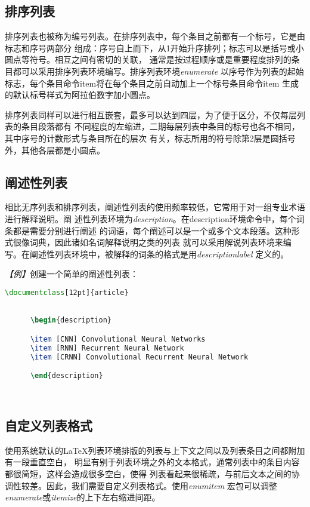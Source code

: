 {\subsection{排序列表}
排序列表也被称为编号列表。在排序列表中，每个条目之前都有一个标号，它是由标志和序号两部分
组成：序号自上而下，从1开始升序排列；标志可以是括号或小圆点等符号。相互之间有密切的关联，
通常是按过程顺序或是重要程度排列的条目都可以采用排序列表环境编写。排序列表环境\emph{enumerate}
以序号作为列表的起始标志，每个条目命令item将在每个条目之前自动加上一个标号条目命令item
生成的默认标号样式为阿拉伯数字加小圆点。

排序列表同样可以进行相互嵌套，最多可以达到四层，为了便于区分，不仅每层列表的条目段落都有
不同程度的左缩进，二期每层列表中条目的标号也各不相同，其中序号的计数形式与条目所在的层次
有关，标志所用的符号除第2层是圆括号外，其他各层都是小圆点。

\subsection{阐述性列表}
相比无序列表和排序列表，阐述性列表的使用频率较低，它常用于对一组专业术语进行解释说明。阐
述性列表环境为\emph{description}。在description环境命令中，每个词条都是需要分别进行阐述
的词语，每个阐述可以是一个或多个文本段落。这种形式很像词典，因此诸如名词解释说明之类的列表
就可以采用解说列表环境来编写。在阐述性列表环境中，被解释的词条的格式是用\emph{descriptionlabel}
定义的。

\emph{【例】}创建一个简单的阐述性列表：
\begin{lstlisting}[language=TeX]
      \documentclass[12pt]{article}
      

      \begin{description}

      \item [CNN] Convolutional Neural Networks
      \item [RNN] Recurrent Neural Network
      \item [CRNN] Convolutional Recurrent Neural Network

      \end{description}

      
\end{lstlisting}

\subsection{自定义列表格式}
使用系统默认的LaTeX列表环境排版的列表与上下文之间以及列表条目之间都附加有一段垂直空白，
明显有别于列表环境之外的文本格式，通常列表中的条目内容都很简短，这样会造成很多空白，使得
列表看起来很稀疏，与前后文本之间的协调性较差。因此，我们需要自定义列表格式。使用\emph{enumitem}
宏包可以调整\emph{enumerate}或\emph{itemize}的上下左右缩进间距。

}
